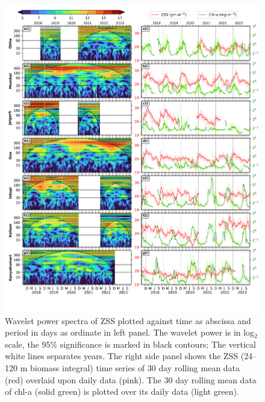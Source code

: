 \documentclass[authoryear,review,12pt]{elsarticle}
\begin{document}
\begin{figure}[htbp]
	\centering
	\includegraphics[width=\textwidth]{./figures/west_coast_wavelet_ss_scale.png} 
	\captionsetup{justification=justified,font=footnotesize,skip=0.05\baselineskip,width=\textwidth}
	\caption{Wavelet power spectra of ZSS plotted against time as abscissa and period in days as ordinate in left panel. The wavelet power is in log$_2$ scale, the 95\% significance is marked in black contours; The vertical white lines separates years. The right side panel shows the ZSS (24--120 m biomass integral) time series of 30 day rolling mean data (red) overlaid upon daily data (pink). The 30 day rolling mean data of chl-a (solid green) is plotted over its daily data (light green).}
	\label{fig:wavess}
\end{figure}
\end{document}
